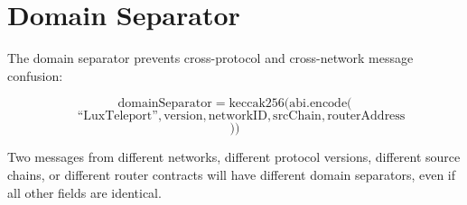 \section{Domain Separator}
\label{sec:domain}

The domain separator prevents cross-protocol and cross-network message confusion:

$$\text{domainSeparator} = \text{keccak256}(\text{abi.encode}($$
$$\quad \text{``LuxTeleport''}, \text{version}, \text{networkID}, \text{srcChain}, \text{routerAddress}$$
$$))$$

Two messages from different networks, different protocol versions, different source chains, or different router contracts will have different domain separators, even if all other fields are identical.


